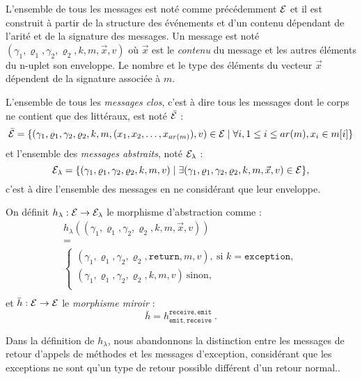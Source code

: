 L'ensemble de tous les messages est not\'e comme pr\'ec\'edemment
${\cal E}$ et il est construit \`a partir de la structure des
\'ev\'enements et d'un contenu d\'ependant de l'arit\'e et de la
signature des messages. Un message est not\'e
$(\gamma_1,\varrho_1,\gamma_2,\varrho_2,k,m,\vec{x},v)$ o\`u
$\vec{x}$ est le \emph{contenu} du message et les autres
\'el\'ements du n-uplet son enveloppe. Le nombre et le type des \'el\'ements du
vecteur $\vec{x}$ d\'ependent de la signature associ\'ee \`a $m$.

L'ensemble de tous les \emph{messages clos}, c'est
\`a dire tous les messages dont le corps ne contient que des
litt\'eraux, est not\'e  $\bar{\cal E}$ :
$$\bar{\cal E} =\{
(\gamma_1,\varrho_1,\gamma_2,\varrho_2,k,m,(x_1,x_2,\dots,x_{ar(m)}),v) \in {\cal E} \mid
\forall i, 1\leq i \leq ar(m), x_i \in m[i]\}$$
et l'ensemble des \emph{messages abstraits}, not\'e  ${\cal E}_\lambda$ :
 $${\cal E}_\lambda = \{
(\gamma_1,\varrho_1,\gamma_2,\varrho_2,k,m,v) \mid \exists
(\gamma_1,\varrho_1,\gamma_2,\varrho_2,k,m,\vec{x},v) \in {\cal
  E}\},$$ c'est \`a dire l'ensemble des messages en ne
consid\'erant que leur enveloppe. 

On d\'efinit $h_\lambda:{\cal
  E}\rightarrow \cal{E}_\lambda$ le morphisme d'abstraction comme : 
\begin{equation}
\begin{array}{c}
h_\lambda((\gamma_1,\varrho_1,\gamma_2,\varrho_2,k,m,\vec{x},v)) \\
=\\
\left\{\begin{array}{l}
(\gamma_1,\varrho_1,\gamma_2,\varrho_2,\mathtt{return},m,v),\ \mbox{si~}k=\mathtt{exception},\\
(\gamma_1,\varrho_1,\gamma_2,\varrho_2,k,m, v)\
\mbox{sinon}, \\
\end{array}\right.\\
\end{array}\label{eq:def-morph-abst}
\end{equation}
et $\bar{h}:{\cal
  E}\rightarrow \cal{E}$ le \emph{morphisme miroir} :
\begin{equation}
\bar{h} =
h_{\mathtt{emit},\mathtt{receive}}^{\mathtt{receive},\mathtt{emit}}\
.\label{eq:def-morph-mirroir}
\end{equation}

Dans la d\'efinition de  $h_\lambda$, nous abandonnons
la distinction entre les messages de retour d'appels de m\'ethodes et
les messages d'exception, consid\'erant que les exceptions ne sont
qu'un type de retour possible diff\'erent d'un retour normal.. 

